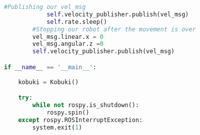 \begin{lstlisting}[caption={Kobuki Class},label={lst:kobukiclass},language=Python]
            #Publishing our vel_msg
            self.velocity_publisher.publish(vel_msg)
            self.rate.sleep()
        #Stopping our robot after the movement is over
        vel_msg.linear.x = 0
        vel_msg.angular.z =0
        self.velocity_publisher.publish(vel_msg)

if __name__ == '__main__':
    
    kobuki = Kobuki()

    try:
        while not rospy.is_shutdown():
            rospy.spin()
    except rospy.ROSInterruptException:
        system.exit(1)
\end{lstlisting}